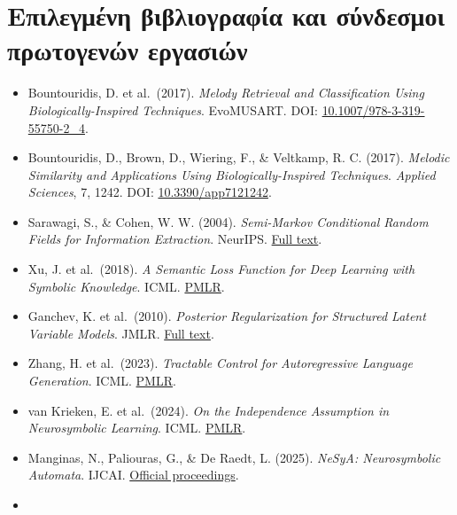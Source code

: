 \documentclass[
  10pt,
  a4paper,
]{report}
\providecommand{\tightlist}{%
  \setlength{\itemsep}{0pt}\setlength{\parskip}{0pt}}
\begin{document}
\chapter{Επιλεγμένη βιβλιογραφία και σύνδεσμοι πρωτογενών
εργασιών}\label{ux3b5ux3c0ux3b9ux3bbux3b5ux3b3ux3bcux3adux3bdux3b7-ux3b2ux3b9ux3b2ux3bbux3b9ux3bfux3b3ux3c1ux3b1ux3c6ux3afux3b1-ux3baux3b1ux3b9-ux3c3ux3cdux3bdux3b4ux3b5ux3c3ux3bcux3bfux3b9-ux3c0ux3c1ux3c9ux3c4ux3bfux3b3ux3b5ux3bdux3ceux3bd-ux3b5ux3c1ux3b3ux3b1ux3c3ux3b9ux3ceux3bd}

\begin{itemize}
\tightlist
\item
  Bountouridis, D. et al.~(2017). \emph{Melody Retrieval and
  Classification Using Biologically-Inspired Techniques}. EvoMUSART.
  DOI:
  \href{https://doi.org/10.1007/978-3-319-55750-2_4}{10.1007/978-3-319-55750-2\_4}.
\item
  Bountouridis, D., Brown, D., Wiering, F., \& Veltkamp, R. C. (2017).
  \emph{Melodic Similarity and Applications Using Biologically-Inspired
  Techniques}. \emph{Applied Sciences}, 7, 1242. DOI:
  \href{https://doi.org/10.3390/app7121242}{10.3390/app7121242}.
\item
  Sarawagi, S., \& Cohen, W. W. (2004). \emph{Semi-Markov Conditional
  Random Fields for Information Extraction}. NeurIPS.
  \href{https://proceedings.neurips.cc/paper_files/paper/2004/file/eb06b9db06012a7a4179b8f3cb5384d3-Paper.pdf}{Full
  text}.
\item
  Xu, J. et al.~(2018). \emph{A Semantic Loss Function for Deep Learning
  with Symbolic Knowledge}. ICML.
  \href{https://proceedings.mlr.press/v80/xu18h.html}{PMLR}.
\item
  Ganchev, K. et al.~(2010). \emph{Posterior Regularization for
  Structured Latent Variable Models}. JMLR.
  \href{https://jmlr.org/papers/volume11/ganchev10a/ganchev10a.pdf}{Full
  text}.
\item
  Zhang, H. et al.~(2023). \emph{Tractable Control for Autoregressive
  Language Generation}. ICML.
  \href{https://proceedings.mlr.press/v202/zhang23g/zhang23g.pdf}{PMLR}.
\item
  van Krieken, E. et al.~(2024). \emph{On the Independence Assumption in
  Neurosymbolic Learning}. ICML.
  \href{https://proceedings.mlr.press/v235/van-krieken24a.html}{PMLR}.
\item
  Manginas, N., Paliouras, G., \& De Raedt, L. (2025). \emph{NeSyA:
  Neurosymbolic Automata}. IJCAI.
  \href{https://ijcai.org/proceedings/2025/662}{Official proceedings}.
\item

\end{itemize}
\end{document}
